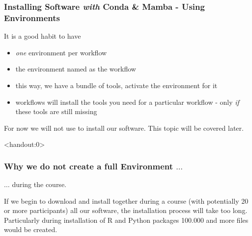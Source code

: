\begin{frame}
  \frametitle{Installing Software \emph{with} Conda \& Mamba - Using Environments}
  \begin{hint}It is a good habit to have
        \begin{itemize}
          \item \emph{one} environment per workflow
          \item the environment named as the workflow
          \item this way, we have a bundle of tools, activate the environment for it
          \item \Snakemake{} workflows will install the tools you need for a particular workflow - only \emph{if} these tools are still missing
         \end{itemize}
  \end{hint}
  \begin{hint}[Note]
  	For now we will not use \Snakemake{} to install our software. This topic will be covered later.
  \end{hint}
\end{frame}

\begin{frame}<handout:0>
	\frametitle{Why we do not create a full Environment $\ldots$}
	$\ldots$ during the course.
	\begin{docs}[Background]
		If we begin to download and install together during a course (with potentially 20 or more participants) all our software, the installation process will take too long. Particularly during installation of R and Python packages 100.000 and more files would be created. 
	\end{docs}
\end{frame}

